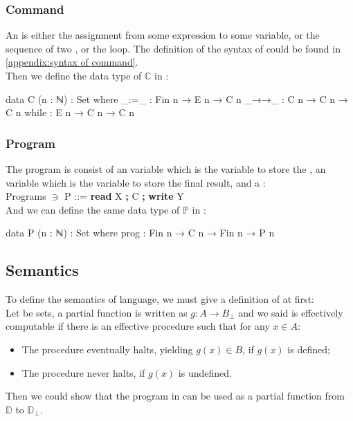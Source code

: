 \subsubsection{Command}
An  is either the assignment from some expression to some variable, or the sequence of two , or the  loop.
The definition of the syntax of  could be found in \ref{appendix:syntax of command}.\\
Then we define the data type of $\mathds{C}$ in \Agda:
\begin{code}
data C (n : ℕ) : Set where
  _:=_   : Fin n  → E n → C n
  _→→_ : C n → C n → C n
  while  : E n → C n → C n
\end{code}
\subsubsection{Program}
The program is consist of an  variable which is the variable to store the , an  variable which is the variable to store the final result, and a :\\
Programs \hspace{0.5cm}$\ni$\hspace{0.4cm} P\hspace{0.6cm} ::= \textbf{read} X \textbf{;} C \textbf{;} \textbf{write} Y\\
And we can define the same data type of $\mathds{P}$ in \Agda:
\begin{code}
data P (n : ℕ) : Set where
  prog : Fin n → C n → Fin n → P n
\end{code}

\subsection{Semantics}
To define the semantics of \WHILE language, we must give a definition of  at first\cite{jones_computability_1997}:\\
Let  be sets, a partial function  is written as $g: A \rightarrow B_\bot$ and we said  is effectively computable if there is an effective procedure such that for any $x \in A$:
\begin{itemize}
  \item The procedure eventually halts, yielding $g(x) \in B$, if $g(x)$ is defined;
  \item The procedure never halts, if $g(x)$ is undefined.
\end{itemize}
Then we could show that the program in \WHILE can be used as a partial function from $\mathds{D}$ to $\mathds{D}_\bot$.
